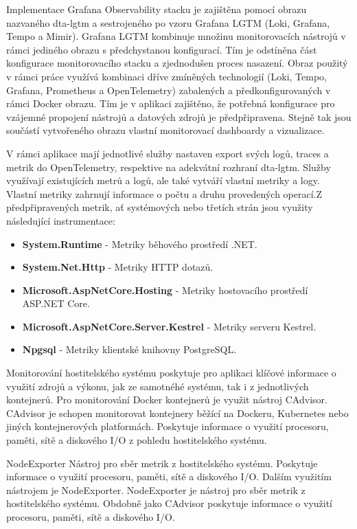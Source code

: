 Implementace Grafana Observability stacku je zajištěna pomocí obrazu nazvaného dta-lgtm a sestrojeného po vzoru Grafana LGTM (Loki, Grafana, Tempo a Mimir). Grafana LGTM kombinuje množinu monitorovacích nástrojů v rámci jediného obrazu s předchystanou konfigurací. Tím je odstíněna část konfigurace monitorovacího stacku a zjednodušen proces nasazení. Obraz použitý v rámci práce využívá kombinaci dříve zmíněných technologií (Loki, Tempo, Grafana, Prometheus a OpenTelemetry) zabalených a předkonfigurovaných v rámci Docker obrazu. Tím je v aplikaci zajištěno, že potřebná konfigurace pro vzájemné propojení nástrojů a datových zdrojů je předpřipravena. Stejně tak jsou součástí vytvořeného obrazu vlastní monitorovací dashboardy a vizualizace.

V rámci aplikace mají jednotlivé služby nastaven export svých logů, traces a metrik do OpenTelemetry, respektive na adekvátní rozhraní dta-lgtm. Služby využívají existujících metrů a logů, ale také vytváří vlastní metriky a logy. 
Vlastní metriky zahrnují informace o počtu a druhu provedených operací.Z předpřipravených metrik, ať systémových nebo třetích strán jsou využity následující instrumentace:

\begin{itemize}
  \item \textbf{System.Runtime} - Metriky běhového prostředí .NET.
  \item \textbf{System.Net.Http} - Metriky HTTP dotazů.
  \item \textbf{Microsoft.AspNetCore.Hosting} - Metriky hostovacího prostředí ASP.NET Core.
  \item \textbf{Microsoft.AspNetCore.Server.Kestrel} - Metriky serveru Kestrel.
  \item \textbf{Npgsql} - Metriky klientské knihovny PostgreSQL.
\end{itemize}


Monitorování hostitelského systému poskytuje pro aplikaci klíčové informace o využití zdrojů a výkonu, jak ze samotnéhé systému, tak i z jednotlivých kontejnerů. Pro monitorování Docker kontejnerů je využit nástroj CAdvisor. CAdvisor je schopen monitorovat kontejnery běžící na Dockeru, Kubernetes nebo jiných kontejnerových platformách. Poskytuje informace o využití procesoru, paměti, sítě a diskového I/O z pohledu hostitelského systému.

NodeExporter Nástroj pro sběr metrik z hostitelského systému. Poskytuje informace o využití procesoru, paměti, sítě a diskového I/O. Dalším využitím nástrojem je NodeExporter. NodeExporter je nástroj pro sběr metrik z hostitelského systému. Obdobně jako CAdvisor poskytuje informace o využití procesoru, paměti, sítě a diskového I/O.

